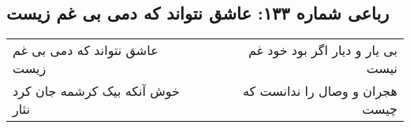 \begin{center}
\section*{رباعی شماره ۱۳۳: عاشق نتواند که دمی بی غم زیست}
\label{sec:sh133}
\begin{longtable}{l p{0.5cm} r}
عاشق نتواند که دمی بی غم زیست
&&
بی یار و دیار اگر بود خود غم نیست
\\
خوش آنکه بیک کرشمه جان کرد نثار
&&
هجران و وصال را ندانست که چیست
\\
\end{longtable}
\end{center}
